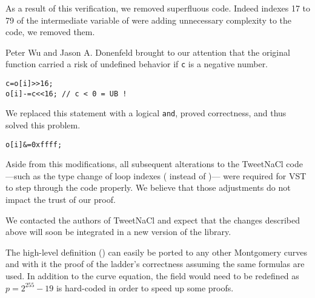 As a result of this verification, we removed superfluous code.
Indeed indexes 17 to 79 of the  intermediate variable of
 were adding unnecessary complexity to the code,
we removed them.

Peter Wu and Jason A. Donenfeld brought to our attention that the original
 function carried a risk of undefined behavior if \texttt{c}
is a negative number.
\begin{lstlisting}[language=Ctweetnacl,stepnumber=0]
c=o[i]>>16;
o[i]-=c<<16; // c < 0 = UB !
\end{lstlisting}
We replaced this statement with a logical \texttt{and}, proved correctness,
and thus solved this problem.
\begin{lstlisting}[language=Ctweetnacl,stepnumber=0]
o[i]&=0xffff;
\end{lstlisting}

Aside from this modifications, all subsequent alterations to the TweetNaCl code%
---such as the type change of loop indexes ( instead of )---%
were required for VST to step through the code properly. We believe that those
adjustments do not impact the trust of our proof.

We contacted the authors of TweetNaCl and expect that the changes described
above will soon be integrated in a new version of the library.





The high-level definition () can easily be ported to any
other Montgomery curves and with it the proof of the ladder's correctness
assuming the same formulas are used.
In addition to the curve equation, the field  would need to be redefined
as $p=2^{255}-19$ is hard-coded in order to speed up some proofs.

